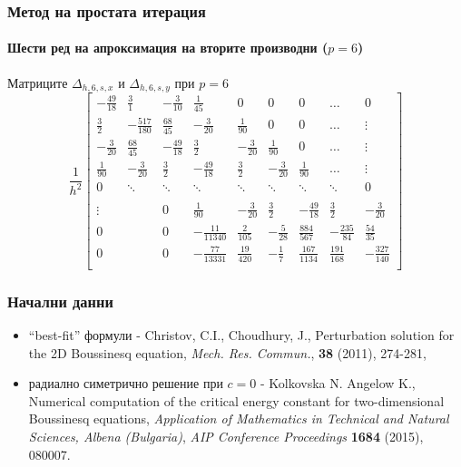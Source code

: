 \documentclass{beamer}
\begin{document}
\begin{frame}
\frametitle{Метод на простата итерация}
\framesubtitle{Шести ред на апроксимация на вторите производни ($p=6$) }
Матриците $\Delta_{h,6,s,x}$ и $\Delta_{h,6,s,y}$ при $p=6$
\[
\frac{1}{h^2}
\begin{bmatrix}
   -\frac{49}{18}		& \frac{3}{1}			&   -\frac{3}{10}		& \frac{1}{45}    		 &  0					& 0	   					&    0      	   	&   \dots           & 0    \\
    \frac{3}{2}    	&-\frac{517}{180}    	&    \frac{68}{45}     & -\frac{3}{20}  	 		& \frac{1}{90} 		&  0					 &   0      	   	&   \dots	       & \vdots  \\
    -\frac{3}{20}		& \frac{68}{45}         	& -\frac{49}{18} 	&  \frac{3}{2}		&  -\frac{3}{20}    	 &   \frac{1}{90}    	 &  0			&     \dots         &\vdots    \\
    \frac{1}{90}		& -\frac{3}{20}		& \frac{3}{2}         	& -\frac{49}{18} 	&  \frac{3}{2}		&  -\frac{3}{20}    	 &   \frac{1}{90} &     \dots         &\vdots    \\
        0           		& \ddots        		&         \ddots           	& \ddots        		&    \ddots   		&   \ddots      		 &     \ddots    	&  \ddots          &    0 \\	
\\
   \vdots      		&            		 	&    	0	      		& \frac{1}{90}		& -\frac{3}{20}		& \frac{3}{2}         	& -\frac{49}{18}	&  \frac{3}{2}  &  -\frac{3}{20} \\
    0      			&              	 	&    0      		&   -\frac{11}{11340}	 	&    \frac{2}{105} 	&  -\frac{5}{28} 	& \frac{884}{567} &-\frac{235}{84} &  \frac{54}{35}\\
    0              	& 	          		&    0              	&  -\frac{77}{13331}    		&  \frac{19}{420}&-\frac{1}{7}	 &  \frac{167}{1134} 	& \frac{191}{168}  &  -\frac{327}{140}\\
\end{bmatrix}
\]
\end{frame}

\begin{frame}
\frametitle{Начални данни}
\begin{itemize}
  \item ``best-fit'' формули - Christov, C.I., Choudhury, J., Perturbation solution for the 2D Boussinesq equation, {\it Mech. Res. Commun.}, \textbf{38} (2011), 274-281,
  \item радиално симетрично решение при $c=0$ - Kolkovska N. Angelow K., Numerical computation of the critical energy constant for two-dimensional Boussinesq equations, {\it Application of Mathematics in Technical and Natural Sciences, Albena (Bulgaria)},
\emph{AIP Conference Proceedings}  \textbf{1684} (2015), 080007.
\end{itemize}


\end{frame}
\end{document}
